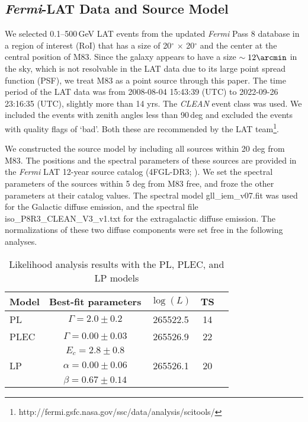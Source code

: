 \documentclass[twocolumn]{aastex631}
\newcommand{\fermi}{\textit{Fermi}}
\begin{document}
\subsection{\fermi-LAT Data and Source Model}
\label{subsec:data}

We selected 0.1--500\,GeV LAT events from the updated \textit{Fermi} Pass 8 
database in a region of interest (RoI) that has a size
of 20$^{\circ}$ $\times$ 20$^{\circ}$ and the center at the central
position of M83. Since the galaxy appears to have a size $\sim 12\arcmin$ in
the sky, which is not resolvable in the LAT data due to its large point 
spread function (PSF), we treat M83 as a point source through this paper.
The time period of the LAT data was
from 2008-08-04 15:43:39 (UTC) to 2022-09-26 23:16:35 (UTC), slightly 
more than 14 yrs.
The \textit{CLEAN} event class was used.
We included the events with zenith angles less than 90\,deg
and excluded the events with quality flags of `bad'. 
Both these are recommended by the LAT team\footnote{\footnotesize http://fermi.gsfc.nasa.gov/ssc/data/analysis/scitools/}.

We constructed the source model by including all sources within 20 deg
from M83.  The positions and the spectral parameters of these sources
are provided in the \textit{Fermi} LAT 12-year source catalog 
(4FGL-DR3; \citealt{4fgl-dr3}).
We set the spectral parameters of the sources 
within 5 deg from M83 free, and froze
the other parameters at their catalog values. 
The spectral model gll\_iem\_v07.fit was used for the Galactic diffuse 
emission, and the spectral file iso\_P8R3\_CLEAN\_V3\_v1.txt for 
the extragalactic diffuse emission. The normalizations of these two diffuse 
components were set free in the following analyses.
\begin{table}
	\begin{center}
\caption{Likelihood analysis results with the PL, PLEC, and LP models}
	\label{tab:model}
	\begin{tabular}{lcccc}
	\hline
	Model & Best-fit parameters & $\log(L)$ & TS \\
	\hline
	PL  & $\Gamma = 2.0 \pm 0.2$  & 265522.5 & 14 \\
	PLEC & $\Gamma = 0.00 \pm 0.03$ & 265526.9 & 22\\
		& $E_c = 2.8 \pm 0.8$ &     &\\
	LP  & $\alpha = 0.00 \pm 0.06$ & 265526.1 & 20 \\
		& $\beta = 0.67 \pm 0.14$ & & \\
\hline
\end{tabular}
\end{center}
\end{table}
\end{document}
